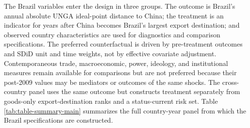 \documentclass[
  12pt,
]{article}
\begin{document}
The Brazil variables enter the design in three groups. The outcome is Brazil's annual absolute UNGA ideal-point distance to China; the treatment is an indicator for years after China becomes Brazil's largest export destination; and observed country characteristics are used for diagnostics and comparison specifications. The preferred counterfactual is driven by pre-treatment outcomes and SDiD unit and time weights, not by effective covariate adjustment. Contemporaneous trade, macroeconomic, power, ideology, and institutional measures remain available for comparisons but are not preferred because their post-2009 values may be mediators or outcomes of the same shocks. The cross-country panel uses the same outcome but constructs treatment separately from goods-only export-destination ranks and a status-current risk set. Table \ref{tab:table-summary-main} summarizes the full country-year panel from which the Brazil specifications are constructed.
\end{document}
